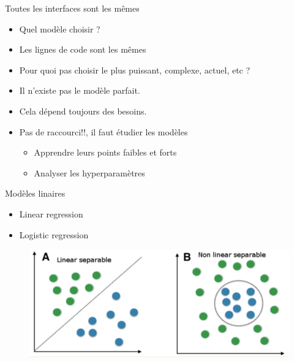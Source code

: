 \documentclass[aspectratio=169,xcolor=dvipsnames, t]{beamer}
\begin{document}
\begin{frame}{Toutes les interfaces sont les mêmes}
	\begin{itemize}
		\item Quel modèle choisir ?
		\item Les lignes de code sont les mêmes
		\item Pour quoi pas choisir le plus puissant, complexe, actuel, etc ?
		\item Il n'existe pas le modèle parfait.
		\item Cela dépend toujours des besoins.
		\item Pas de raccourci!!, il faut étudier les modèles
		\begin{itemize}			
			\item Apprendre leurs points faibles et forts
			\item Analyser les hyperparamètres
		\end{itemize}
	\end{itemize}
	
\end{frame}

\begin{frame}{Modèles linaires}
	\begin{itemize}
		\item Linear regression 
		\item Logistic regression 
		\end{itemize}
	\begin{figure}
		\includegraphics[height=0.4\paperheight ]{figures/cm2_LinealModels.png}
	\end{figure}
\end{frame}

\end{document}
